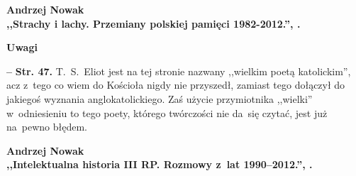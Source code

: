 \documentclass[a4paper,11pt]{article}
\newcommand{\spaceOne}{2em}
\newcommand{\tb}{\textbf}
\newcommand{\noi}{\noindent}
\newcommand{\start}{\noi \tb{--} {}}
\newcommand{\Center}[1]{\begin{center} #1 \end{center}}
\newcommand{\CenterTB}[1]{\Center{\tb{#1}}}
\newcommand{\Str}[1]{\tb{Str. #1.}}
\newcommand{\Work}[1]{ \begin{center} {\large \tb{#1}} \end{center} }
\begin{document}
\vspace{\spaceOne}



\Work{
  Andrzej Nowak \\
  ,,Strachy i lachy. Przemiany polskiej pamięci 1982-2012.'',
  \cite{Now12}.}


\CenterTB{Uwagi}

\start \Str{47} T.~S.~Eliot jest na tej stronie nazwany ,,wielkim
poetą katolickim'', acz z~tego co wiem do Kościoła nigdy nie
przyszedł, zamiast tego dołączył do jakiegoś wyznania
anglokatolickiego. Zaś użycie przymiotnika ,,wielki'' w~odniesieniu to
tego poety, którego twórczości nie da~się czytać, jest już na~pewno
błędem.



\vspace{\spaceOne}



\Work{
  Andrzej Nowak \\
  ,,Intelektualna historia III RP. Rozmowy z~lat 1990--2012.'',
  \cite{Now13}.}
\end{document}
